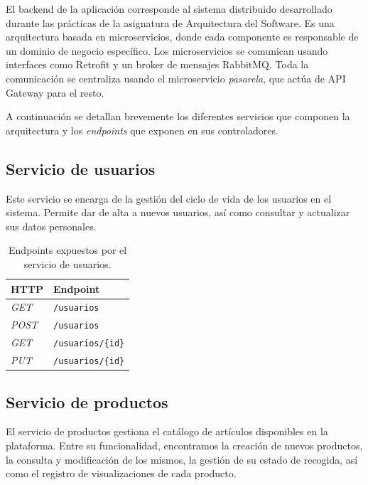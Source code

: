 \documentclass[11pt]{article}
\begin{document}
  El backend de la aplicación corresponde al sistema distribuido desarrollado
  durante las prácticas de la asignatura de Arquitectura del Software. Es una
  arquitectura basada en microservicios, donde cada componente es responsable de
  un dominio de negocio específico. Los microservicios se comunican usando
  interfaces como Retrofit y un broker de mensajes RabbitMQ. Toda la comunicación
  se centraliza usando el microservicio \textit{pasarela}, que actúa de API
  Gateway para el resto.

  A continuación se detallan brevemente los diferentes servicios que componen la
  arquitectura y los \textit{endpoints} que exponen en sus controladores.

  \subsection{Servicio de usuarios}

      Este servicio se encarga de la gestión del ciclo de vida de los usuarios en el
      sistema. Permite dar de alta a nuevos usuarios, así como consultar y actualizar
      sus datos personales.

      \setlength{\tabcolsep}{15pt}
      \begin{table}[H]
          \centering
          \begin{tabular}{l l}
              \hline
              \textbf{HTTP} & \textbf{Endpoint}         \\
              \hline
              \textit{GET}  & \texttt{/usuarios}        \\
              \textit{POST} & \texttt{/usuarios}        \\
              \textit{GET}  & \texttt{/usuarios/\{id\}} \\
              \textit{PUT}  & \texttt{/usuarios/\{id\}} \\
              \hline
          \end{tabular}
          \caption{Endpoints expuestos por el servicio de usuarios.}
          \label{tab:endpoints-usuarios}
      \end{table}

  \subsection{Servicio de productos}

      El servicio de productos gestiona el catálogo de artículos disponibles en la
      plataforma. Entre su funcionalidad, encontramos la creación de nuevos
      productos, la consulta y modificación de los mismos, la gestión de su estado de
      recogida, así como el registro de visualizaciones de cada producto.
\end{document}

